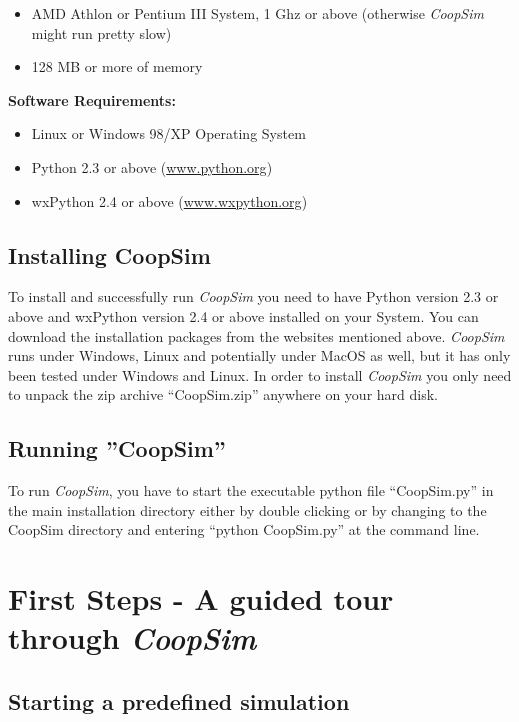 \documentclass[12pt,a4paper,USenglish]{article}
\begin{document}
\begin{itemize}
\item AMD Athlon or Pentium III System, 1 Ghz or above (otherwise
\emph{CoopSim} might run pretty slow)
\item 128 MB or more of memory

\end{itemize}

\noindent \textbf{Software Requirements:}

\begin{itemize}
\item Linux or Windows 98/XP Operating System
\item Python 2.3 or above (\url{www.python.org})
\item wxPython 2.4 or above (\url{www.wxpython.org})
\end{itemize}

\subsection{Installing CoopSim}

To install and successfully run {\em CoopSim} you need to have Python
version 2.3 or above and wxPython version 2.4 or above installed on
your System. You can download the installation packages from the websites
mentioned above. \emph{CoopSim} runs under Windows, Linux and potentially 
under MacOS as well, but it has only been tested under Windows and Linux.
In order to install \emph{CoopSim} you only need to unpack the zip archive
``CoopSim.zip'' anywhere on your hard disk.


\subsection{Running ''CoopSim''}

To run \emph{CoopSim}, you have to start the executable python file
``CoopSim.py'' in the main installation directory either by double
clicking or by changing to the CoopSim directory and entering ``python
CoopSim.py'' at the command line.


\section{First Steps - A guided tour through \emph{CoopSim}}


\subsection{Starting a predefined simulation}
\end{document}
